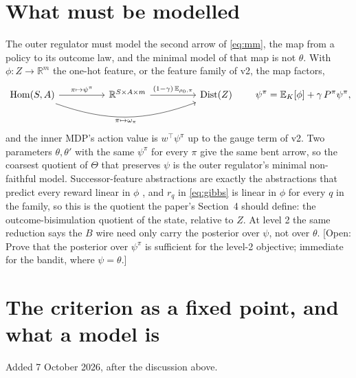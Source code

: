 \documentclass[10pt]{article}
\theoremstyle{plain}
\newcommand{\E}{\mathbb E}
\newcommand{\Hom}{\operatorname{Hom}}
\newcommand{\open}[1]{\textcolor{red!70!black}{[Open: #1]}}
\begin{document}
\section{What must be modelled}
\label{sec:sf}

The outer regulator must model the second arrow of \eqref{eq:mm}, the map from a policy to its outcome law, and the minimal model of that map is not $\theta$.
With $\phi\colon Z \to \mathbb R^m$ the one-hot feature, or the feature family of v2, the map factors,
\begin{equation}
\begin{tikzcd}[column sep=huge]
\Hom(S,A) \arrow[r, "\pi \mapsto \psi^\pi"] \arrow[rr, bend right=20, "\pi \mapsto \omega_\pi"'] & \mathbb R^{S \times A \times m} \arrow[r, "(1-\gamma)\,\E_{\rho_0,\pi}"] & \mathrm{Dist}(Z)
\end{tikzcd}
\qquad
\psi^\pi = \E_K[\phi] + \gamma\, P^\pi \psi^\pi ,
\label{eq:sf}
\end{equation}
and the inner MDP's action value is $w^\top \psi^\pi$ up to the gauge term of v2.
Two parameters $\theta, \theta'$ with the same $\psi^\pi$ for every $\pi$ give the same bent arrow, so the coarsest quotient of $\Theta$ that preserves $\psi$ is the outer regulator's minimal non-faithful model.
Successor-feature abstractions are exactly the abstractions that predict every reward linear in $\phi$ \citep{Lehnert-successor19}, and $r_q$ in \eqref{eq:gibbs} is linear in $\phi$ for every $q$ in the family, so this is the quotient the paper's Section~4 should define: the outcome-bisimulation quotient of the state, relative to $Z$.
At level 2 the same reduction says the $B$ wire need only carry the posterior over $\psi$, not over $\theta$.
\open{Prove that the posterior over $\psi^\pi$ is sufficient for the level-2 objective; immediate for the bandit, where $\psi = \theta$.}

\section{The criterion as a fixed point, and what a model is}
\label{sec:fixedpoint}
Added 7 October 2026, after the discussion above.
\end{document}

